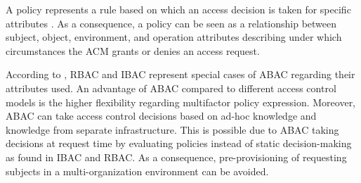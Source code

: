 A policy represents a rule based on which an access decision is taken for specific attributes \cite{Hu2014}.
As a consequence, a policy can be seen as a relationship between subject, object, environment, and operation attributes describing under which circumstances the ACM grants or denies an access request.

According to \citeauthor{Hu2014} \cite{Hu2014}, RBAC and IBAC represent special cases of ABAC regarding their attributes used.
An advantage of ABAC compared to different access control models is the higher flexibility regarding multifactor policy expression.
Moreover, ABAC can take access control decisions based on ad-hoc knowledge and knowledge from separate infrastructure.
This is possible due to ABAC taking decisions at request time by evaluating policies instead of static decision-making as found in IBAC and RBAC.
As a consequence, pre-provisioning of requesting subjects in a multi-organization environment can be avoided.





